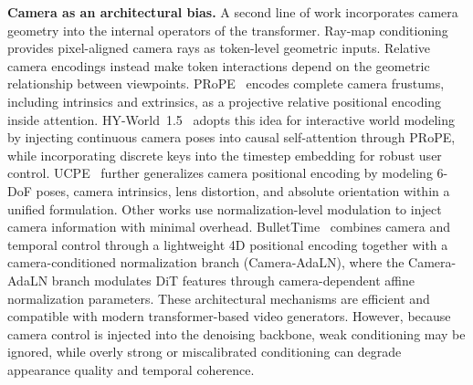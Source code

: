 \textbf{Camera as an architectural bias.}
A second line of work incorporates camera geometry into the internal operators of the transformer.
Ray-map conditioning provides pixel-aligned camera rays as token-level geometric inputs.
Relative camera encodings instead make token interactions depend on the geometric relationship between viewpoints.
PRoPE~\cite{li2025prope} encodes complete camera frustums, including intrinsics and extrinsics, as a projective relative positional encoding inside attention.
HY-World~1.5~\cite{hyworld2025} adopts this idea for interactive world modeling by injecting continuous camera poses into causal self-attention through PRoPE, while incorporating discrete keys into the timestep embedding for robust user control.
UCPE~\cite{zhang2025ucpe} further generalizes camera positional encoding by modeling 6-DoF poses, camera intrinsics, lens distortion, and absolute orientation within a unified formulation.
Other works use normalization-level modulation to inject camera information with minimal overhead.
BulletTime~\cite{wang2025bullettime} combines camera and temporal control through a lightweight 4D positional encoding together with a camera-conditioned normalization branch (Camera-AdaLN), where the Camera-AdaLN branch modulates DiT features through camera-dependent affine normalization parameters.
These architectural mechanisms are efficient and compatible with modern transformer-based video generators.
However, because camera control is injected into the denoising backbone, weak conditioning may be ignored, while overly strong or miscalibrated conditioning can degrade appearance quality and temporal coherence.


